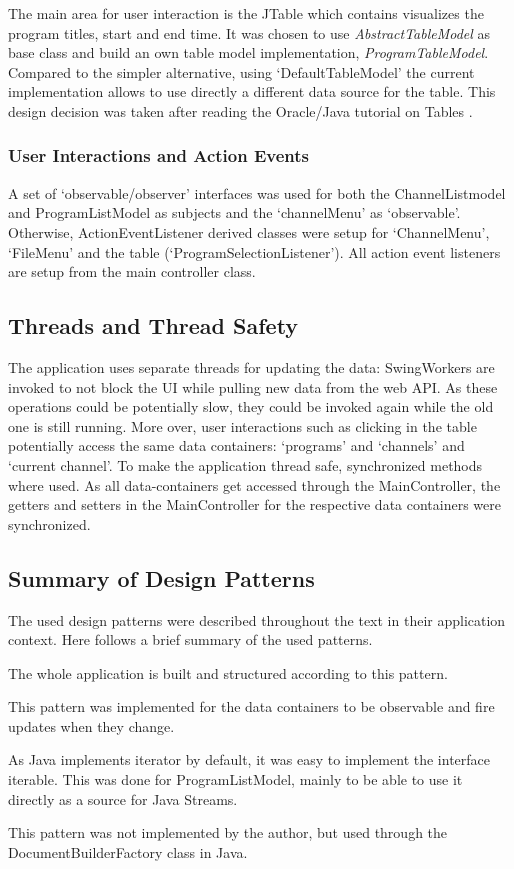 \documentclass[a4paper,11pt,twoside]{article}
\begin{document}
The main area for user interaction is the JTable which contains visualizes the program titles, start and end time. It was chosen to use \textit{AbstractTableModel} as base class and build an own table model implementation, \textit{ProgramTableModel}. Compared to the simpler alternative, using `DefaultTableModel' the current implementation allows to use directly a different data source for the table. This design decision was taken after reading the Oracle/Java tutorial on Tables \cite{javatables}.

\subsubsection{User Interactions and Action Events}
A set of `observable/observer' interfaces was used for both the ChannelListmodel and ProgramListModel as subjects and the `channelMenu' as `observable'. Otherwise, ActionEventListener derived classes were setup for `ChannelMenu', `FileMenu' and the table (`ProgramSelectionListener'). All action event listeners are setup from the main controller class.   



\subsection{Threads and Thread Safety}
The application uses separate threads for updating the data: SwingWorkers are invoked to not block the UI while pulling new data from the web API. As these operations could be potentially slow, they could be invoked again while the old one is still running. More over, user interactions such as clicking in the table potentially access the same data containers: `programs' and `channels' and `current channel'.
To make the application thread safe, synchronized methods where used. As all data-containers get accessed through the MainController, the getters and setters in the MainController for the respective data containers were synchronized. 


\subsection{Summary of Design Patterns}
The used design patterns were described throughout the text in their application context. Here follows a brief summary of the used patterns.
\begin{description}[align=left, labelwidth=4cm]
\item [Model-View-Controller] The whole application is built and structured according to this pattern.
\item [Observer-Observable] This pattern was implemented for the data containers to be observable and fire updates when they change. 
\item [Iterator] As Java implements iterator by default, it was easy to implement the interface iterable. This was done for ProgramListModel, mainly to be able to use it directly as a source for Java Streams. 
\item [Factory Method] This pattern was not implemented by the author, but used through the DocumentBuilderFactory class in Java. 
\end{description}
\end{document}
